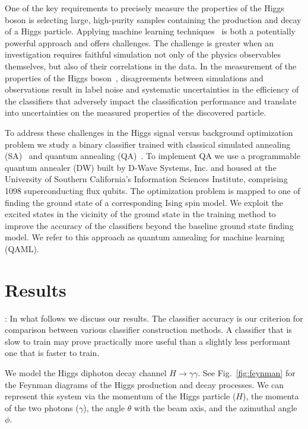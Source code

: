 \documentclass[.chapters/Higgs/.chapters/Higgs/main.tex]{subfiles}
\begin{document}
One of the key requirements to precisely measure the properties of the Higgs boson is selecting  
large, high-purity samples containing the production and decay of a Higgs particle.  Applying machine learning techniques~\cite{1742-6596-664-7-072015} is both a potentially powerful approach and offers challenges. The challenge is greater when an investigation requires faithful simulation 
not only of the physics observables themselves, but also of their correlations in the data.   In the measurement of the properties of the Higgs boson~\cite{Khachatryan:2014ira}, disagreements between simulations and observations result in label noise and systematic uncertainties in the efficiency of the classifiers that adversely impact the classification performance and  translate into uncertainties on the measured properties of the discovered particle.

To address these challenges in the Higgs signal versus background optimization problem we study a binary classifier trained with classical simulated annealing (SA)~\cite{kirkpatrick_optimization_1983,katzgraber:06a} and quantum annealing (QA)~\cite{kadowaki_quantum_1998,RevModPhys.80.1061,Neven1,Pudenz:2013kx,q-sig2}. To implement QA we use a programmable quantum annealer (DW) built by D-Wave Systems, Inc. and housed at the University of Southern California's Information Sciences Institute, comprising 1098 superconducting flux qubits. The optimization problem is mapped to one of finding the ground state of a corresponding Ising spin model. We exploit the excited states in the vicinity of the ground state in the training method to improve the accuracy of the classifiers beyond the baseline ground state finding model. We refer to this  approach as quantum annealing for machine learning (QAML). 


\section*{Results}:
In what follows we  discuss our results. 
The classifier accuracy is our criterion for comparison between various classifier construction methods.  A classifier that is slow to train may prove practically more useful than a slightly less performant one that is faster to train. 


We model the Higgs diphoton decay channel $H\rightarrow\gamma\gamma$. See Fig.~\ref{fig:feynman} for the Feynman diagrams of the Higgs production and decay processes. We can represent this system via the momentum of the Higgs particle ($H$), the momenta of the two photons ($\gamma$), the angle $\theta$ with the beam axis, and the azimuthal angle $\phi$.
 
\end{document}
